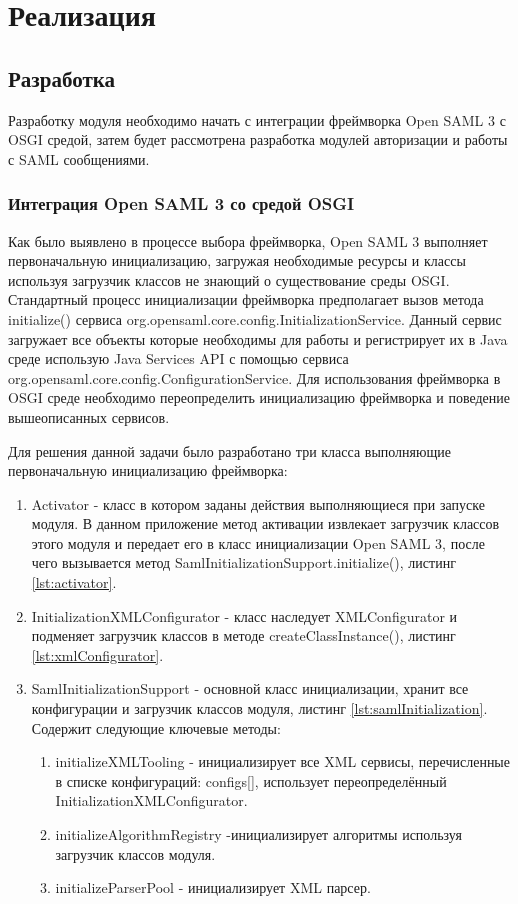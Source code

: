 \chapter{Реализация}
\label{cha:impl}

\section{Разработка}
Разработку модуля необходимо начать с интеграции фреймворка Open SAML 3 с OSGI средой, затем будет рассмотрена разработка модулей авторизации и работы с SAML сообщениями.

\subsection{Интеграция Open SAML 3 со средой OSGI}
Как было выявлено в процессе выбора фреймворка, Open SAML 3 выполняет первоначальную инициализацию, загружая необходимые ресурсы и классы используя загрузчик классов не знающий о существование среды OSGI. Стандартный процесс инициализации фреймворка предполагает вызов метода initialize() сервиса org.opensaml.core.config.InitializationService. Данный сервис загружает все объекты которые необходимы для работы и регистрирует их в Java среде использую Java Services API с помощью сервиса org.opensaml.core.config.ConfigurationService. Для использования фреймворка в OSGI среде необходимо переопределить инициализацию фреймворка и поведение вышеописанных сервисов.

Для решения данной задачи было разработано три класса выполняющие первоначальную инициализацию фреймворка:
\begin{enumerate}
\item Activator - класс в котором заданы действия выполняющиеся при запуске модуля. В данном приложение метод активации извлекает загрузчик классов этого модуля и передает его в класс инициализации Open SAML 3, после чего вызывается метод SamlInitializationSupport.initialize(), листинг \ref{lst:activator}.
\item InitializationXMLConfigurator - класс наследует XMLConfigurator и подменяет загрузчик классов в методе createClassInstance(), листинг \ref{lst:xmlConfigurator}.
\item SamlInitializationSupport - основной класс инициализации, хранит все конфигурации и загрузчик классов модуля, листинг \ref{lst:samlInitialization}. Содержит следующие ключевые методы:
\begin{enumerate}
\item initializeXMLTooling - инициализирует все XML сервисы, перечисленные в списке конфигураций: configs[], использует переопределённый InitializationXMLConfigurator.
\item initializeAlgorithmRegistry -инициализирует алгоритмы используя загрузчик классов модуля.
\item initializeParserPool - инициализирует XML парсер.
\end{enumerate}
\end{enumerate}

